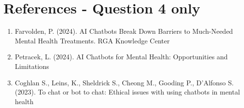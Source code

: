 \documentclass[
	letterpaper, %
]{jdf}
\begin{document}
\newpage

\section{References - Question 4 only}

\printbibliography[heading=none]
\begin{enumerate}
    \item Farvolden, P. (2024). AI Chatbots Break Down Barriers to Much-Needed Mental Health Treatments. RGA Knowledge Center
    \item Petracek, L. (2024). AI Chatbots for Mental Health: Opportunities and Limitations
    \item Coghlan S., Leins, K., Sheldrick S., Cheong M., Gooding P., D'Alfonso S. (2023). To chat or bot to chat: Ethical issues with using chatbots in mental health

\end{enumerate}
\end{document}
